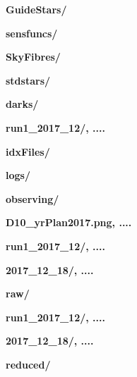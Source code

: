 \documentclass[12pt]{article}
\begin{document}
\hspace{15mm} \textbf{GuideStars/}
\vspace{1mm}

\hspace{15mm} \textbf{sensfuncs/}
\vspace{1mm}

\hspace{15mm} \textbf{SkyFibres/}
\vspace{1mm}

\hspace{15mm} \textbf{stdstars/}
\vspace{1mm}

\hspace{10mm} \textbf{darks/} 
\vspace{1mm}

\hspace{15mm} \textbf{run1\_2017\_12/, ....}
\vspace{1mm}

\hspace{10mm} \textbf{idxFiles/} 
\vspace{1mm}

\hspace{10mm} \textbf{logs/} 
\vspace{1mm}

\hspace{10mm} \textbf{observing/} 
\vspace{1mm}

\hspace{15mm} \textbf{D10\_yrPlan2017.png, ....} 
\vspace{1mm}

\hspace{15mm} \textbf{run1\_2017\_12/, ....} 
\vspace{1mm}

\hspace{30mm} \textbf{2017\_12\_18/, ....}
\vspace{1mm}

\hspace{10mm} \textbf{raw/} 
\vspace{1mm}

\hspace{15mm} \textbf{run1\_2017\_12/, ....} 
\vspace{1mm}

\hspace{30mm} \textbf{2017\_12\_18/, ....} 
\vspace{1mm}

\hspace{10mm} \textbf{reduced/}
\vspace{1mm}
\end{document}

